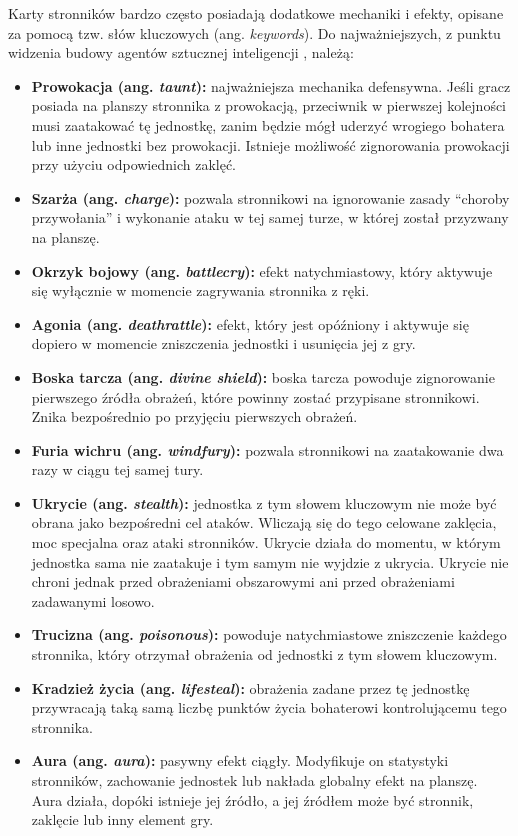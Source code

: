 Karty stronników bardzo często posiadają dodatkowe mechaniki i efekty, opisane za pomocą tzw. słów kluczowych (ang. \textit{keywords}). Do najważniejszych, z punktu widzenia budowy agentów sztucznej inteligencji \cite{sanchez2020}, należą:
\begin{itemize}
\item \textbf{Prowokacja (ang. \textit{taunt}):} najważniejsza mechanika defensywna. Jeśli gracz posiada na planszy stronnika z prowokacją, przeciwnik w pierwszej kolejności musi zaatakować tę jednostkę, zanim będzie mógł uderzyć wrogiego bohatera lub inne jednostki bez prowokacji. Istnieje możliwość zignorowania prowokacji przy użyciu odpowiednich zaklęć.
\item \textbf{Szarża (ang. \textit{charge}):} pozwala stronnikowi na ignorowanie zasady \enquote{choroby przywołania} i wykonanie ataku w tej samej turze, w której został przyzwany na planszę.
\item \textbf{Okrzyk bojowy (ang. \textit{battlecry}):} efekt natychmiastowy, który aktywuje się wyłącznie w momencie zagrywania stronnika z ręki.
\item \textbf{Agonia (ang. \textit{deathrattle}):} efekt, który jest opóźniony i aktywuje się dopiero w momencie zniszczenia jednostki i usunięcia jej z gry.
\item \textbf{Boska tarcza (ang. \textit{divine shield}):} boska tarcza powoduje zignorowanie pierwszego źródła obrażeń, które powinny zostać przypisane stronnikowi. Znika bezpośrednio po przyjęciu pierwszych obrażeń.
\item \textbf{Furia wichru (ang. \textit{windfury}):} pozwala stronnikowi na zaatakowanie dwa razy w ciągu tej samej tury.
\item \textbf{Ukrycie (ang. \textit{stealth}):} jednostka z tym słowem kluczowym nie może być obrana jako bezpośredni cel ataków. Wliczają się do tego celowane zaklęcia, moc specjalna oraz ataki stronników. Ukrycie działa do momentu, w którym jednostka sama nie zaatakuje i tym samym nie wyjdzie z ukrycia. Ukrycie nie chroni jednak przed obrażeniami obszarowymi ani przed obrażeniami zadawanymi losowo.
\item \textbf{Trucizna (ang. \textit{poisonous}):} powoduje natychmiastowe zniszczenie każdego stronnika, który otrzymał obrażenia od jednostki z tym słowem kluczowym.
\item \textbf{Kradzież życia (ang. \textit{lifesteal}):} obrażenia zadane przez tę jednostkę przywracają taką samą liczbę punktów życia bohaterowi kontrolującemu tego stronnika.
\item \textbf{Aura (ang. \textit{aura}):} pasywny efekt ciągły. Modyfikuje on statystyki stronników, zachowanie jednostek lub nakłada globalny efekt na planszę. Aura działa, dopóki istnieje jej źródło, a jej źródłem może być stronnik, zaklęcie lub inny element gry.
\end{itemize}


